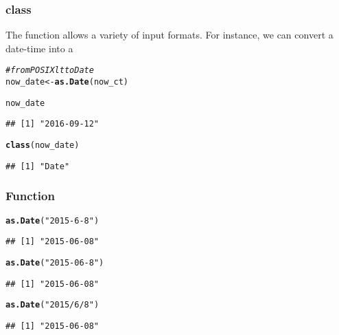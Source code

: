 \documentclass[12pt]{beamer}\usepackage[]{graphicx}\usepackage[]{color}
\makeatletter
\newcommand{\hlstr}[1]{\textcolor[rgb]{0.192,0.494,0.8}{#1}}%
\newcommand{\hlcom}[1]{\textcolor[rgb]{0.678,0.584,0.686}{\textit{#1}}}%
\newcommand{\hlstd}[1]{\textcolor[rgb]{0.345,0.345,0.345}{#1}}%
\newcommand{\hlkwb}[1]{\textcolor[rgb]{0.69,0.353,0.396}{#1}}%
\newcommand{\hlkwd}[1]{\textcolor[rgb]{0.737,0.353,0.396}{\textbf{#1}}}%
\newenvironment{kframe}{%
 \def\at@end@of@kframe{}%
 \ifinner\ifhmode%
  \def\at@end@of@kframe{\end{minipage}}%
  \begin{minipage}{\columnwidth}%
 \fi\fi%
 \def\FrameCommand##1{\hskip\@totalleftmargin \hskip-\fboxsep
 \colorbox{shadecolor}{##1}\hskip-\fboxsep
     \hskip-\linewidth \hskip-\@totalleftmargin \hskip\columnwidth}%
 \MakeFramed {\advance\hsize-\width
   \@totalleftmargin\z@ \linewidth\hsize
   \@setminipage}}%
 {\par\unskip\endMakeFramed%
 \at@end@of@kframe}
\newenvironment{knitrout}{}{} %
\makeatother
\begin{document}
\begin{frame}[fragile]
\frametitle{ class}

The function  allows a variety of input formats. For instance, we can convert a  date-time into a 
\begin{knitrout}\footnotesize
{}\color{fgcolor}\begin{kframe}
\begin{alltt}
\hlcom{# from POSIXlt to Date}
\hlstd{now_date} \hlkwb{<-} \hlkwd{as.Date}\hlstd{(now_ct)}

\hlstd{now_date}
\end{alltt}
\begin{verbatim}
## [1] "2016-09-12"
\end{verbatim}
\begin{alltt}
\hlkwd{class}\hlstd{(now_date)}
\end{alltt}
\begin{verbatim}
## [1] "Date"
\end{verbatim}
\end{kframe}
\end{knitrout}

\end{frame}


\begin{frame}[fragile]
\frametitle{Function }

\begin{knitrout}\footnotesize
{}\color{fgcolor}\begin{kframe}
\begin{alltt}
\hlkwd{as.Date}\hlstd{(}\hlstr{"2015-6-8"}\hlstd{)}
\end{alltt}
\begin{verbatim}
## [1] "2015-06-08"
\end{verbatim}
\begin{alltt}
\hlkwd{as.Date}\hlstd{(}\hlstr{"2015-06-8"}\hlstd{)}
\end{alltt}
\begin{verbatim}
## [1] "2015-06-08"
\end{verbatim}
\begin{alltt}
\hlkwd{as.Date}\hlstd{(}\hlstr{"2015/6/8"}\hlstd{)}
\end{alltt}
\begin{verbatim}
## [1] "2015-06-08"
\end{verbatim}
\end{kframe}
\end{knitrout}

\end{frame}
\end{document}
